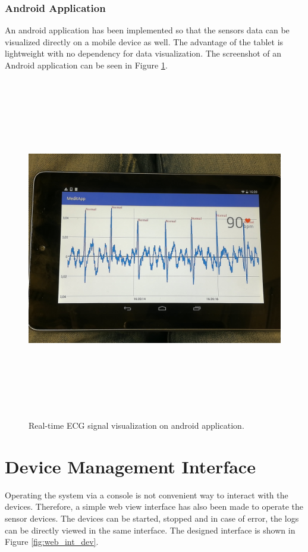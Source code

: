 \subsubsection{Android Application}
An android application has been implemented so that the sensors data can be visualized directly on a mobile device as well. The advantage of the tablet is lightweight with no dependency for data visualization. The screenshot of an Android application can be seen in Figure \ref{fig:ecg_and}.

\begin{figure}[htpb]
	\centering
	\includegraphics[width=16cm,height=15cm,keepaspectratio=true]{images/ecg_and}
	\caption{
		Real-time ECG signal visualization on android application.
	}
	\label{fig:ecg_and}
\end{figure}



\section{Device Management Interface}
Operating the system via a console is not convenient way to interact with the devices. Therefore, a simple web view interface has also been made to operate the sensor devices. The devices can be started, stopped and in case of error, the logs can be directly viewed in the same interface. The designed interface is shown in Figure \ref{fig:web_int_dev}.


